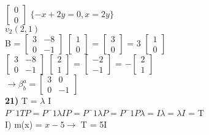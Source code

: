 \documentclass[a4paper,12pt]{report}
\begin{document}
$\left [\begin{array}{rrr}
0\\
0
\end{array}\right] $
$\lbrace -x + 2y = 0, x = 2y \rbrace$ \\

$v_2(2,1) $\\

B = $[\begin{array}{rrr}
3&-8\\
0&-1
\end{array}]$
$  [\begin{array}{rrr} 1\\ 0 \end{array}] $   =
$ [\begin{array}{rrr} 3\\ 0 \end{array}]$  = 3 
$[\begin{array}{rrr} 1\\ 0 \end{array}]$  \\

$\left [\begin{array}{rrr}
3&-8\\
0&-1
\end{array}\right]$  $\left [\begin{array}{rrr}
2\\
1
\end{array}\right]$  = $\left [\begin{array}{rrr}
-2\\
-1
\end{array}\right]$   = $- \left [\begin{array}{rrr}
2\\
1
\end{array}\right]$  \\

$\rightarrow \beta_b^a = \left [\begin{array}{rrr}
3&0\\
0&-1
\end{array}\right]  $ \\

\textbf{21)}
T = $\lambda$ I \\

$P^-1 T P = P^-1 \lambda I P = P^-1 \lambda P = P^-1 P \lambda = I \lambda = \lambda I$ = T \\

I) m(x) = $x-5 \rightarrow$ T = 5I\\
\end{document}
